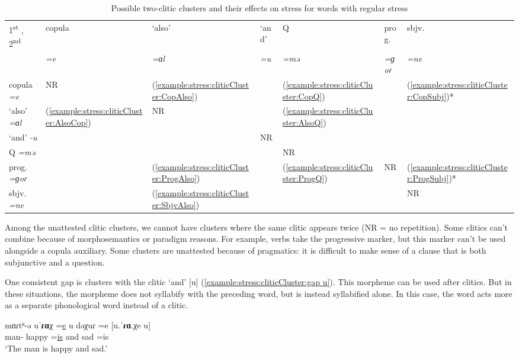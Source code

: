 \begin{table}[H]
	\centering
	\caption{Possible two-clitic clusters and their effects on stress for words with regular stress}
	\label{tab:two clitic cluster summary}
	\begin{tabular}{|l|lll lll|}
		\hline   1\textsuperscript{st} ,  2\textsuperscript{nd} &  copula & `also'  & `and'  & Q  & prog.  & sbjv.   \\
		&  \textit{=e} &  \textit{=ɑl} &   \textit{=u} &   \textit{=mə} &  \textit{=ɡoɾ}&  \textit{=ne}  \\
		\hline 
		copula \textit{=e} & NR & (\ref{example:stress:cliticCluster:CopAlso}) & & (\ref{example:stress:cliticCluster:CopQ}) & & (\ref{example:stress:cliticCluster:CopSubj})*
		\\
		`also' \textit{=ɑl} &(\ref{example:stress:cliticCluster:AlsoCop}) &NR  & & (\ref{example:stress:cliticCluster:AlsoQ}) & & 
		\\
		`and' \textit{-u} & & & NR& & & 
		\\
		Q \textit{=mə} & & &  & NR & & 
		\\
		prog.  \textit{=ɡoɾ}& & (\ref{example:stress:cliticCluster:ProgAlso}) & & (\ref{example:stress:cliticCluster:ProgQ}) &NR & (\ref{example:stress:cliticCluster:ProgSubj})*
		\\
		sbjv.  \textit{=ne}   &  &  (\ref{example:stress:cliticCluster:SbjvAlso}) & &   & & NR
		\\
		\hline
	\end{tabular}
\end{table}


Among the unattested clitic clusters, we cannot have clusters where the same clitic appears twice (NR = no repetition). Some clitics can't combine because of morphosemantics or paradigm reasons. For example, verbs take the progressive marker, but this marker can't be used alongside a copula auxiliary. Some clusters are unattested because of pragmatics: it is difficult to make sense of a clause that is both subjunctive and a question. 

One consistent gap is clusters with the clitic `and' [u] (\ref{example:stress:cliticCluster:gap u}). This morpheme can be used after clitics. But in these situations, the morpheme does not syllabify with the preceding word, but is instead syllabified alone. In this case, the word acts more as a separate phonological word instead of a clitic. 

\begin{exe}
	\ex\gll mɑɾtʰ-ə uˈ\textbf{ɾɑ}χ =\underline{e} u dəχuɾ =e  [u.ˈ\textbf{ɾɑ}.χe u]
	\\
	man-{} happy =\underline{is} and sad =is
	\\
	\trans `The man is happy and sad.' 
	\label{example:stress:cliticCluster:gap u}
	\\
	
\end{exe}

